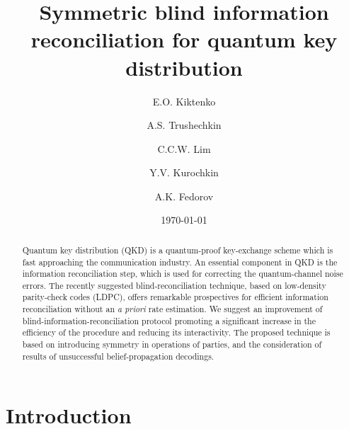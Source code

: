 \documentclass[aps,pra,twocolumn,amsmath,amssymb,nofootinbib,showpacs,superscriptaddress]{revtex4-1}
\begin{document}

\title{Symmetric blind information reconciliation for quantum key distribution}

\author{E.O. Kiktenko}

\author{A.S. Trushechkin}

\author{C.C.W. Lim}

\author{Y.V. Kurochkin}

\author{A.K. Fedorov}

\date{\today}
\begin{abstract}
Quantum key distribution (QKD) is a quantum-proof key-exchange scheme which is fast approaching the communication industry. 
An essential component in QKD is the information reconciliation step, which is used for correcting the quantum-channel noise errors. 
The recently suggested blind-reconciliation technique, based on low-density parity-check codes (LDPC), 
offers remarkable prospectives for efficient information reconciliation without an {\it a priori} rate estimation. 
We suggest an improvement of blind-information-reconciliation protocol promoting a significant increase in the efficiency of the procedure and reducing its interactivity. 
The proposed technique is based on introducing symmetry in operations of parties, and the consideration of results of unsuccessful belief-propagation decodings.
\end{abstract}
\maketitle

\section{Introduction}
\end{document}
